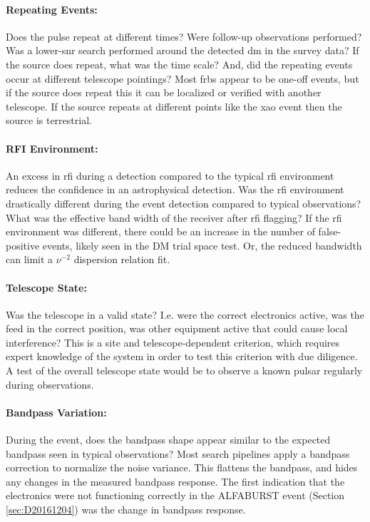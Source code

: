 \documentclass[a4paper,fleqn,usenatbib]{mnras}
\begin{document}
\paragraph{Repeating Events:}

Does the pulse repeat at different times? Were follow-up observations performed?
Was a lower-\gls{snr} search performed around the detected \gls{dm} in the
survey data? If the source does repeat, what was the time scale? And, did the
repeating events occur at different telescope pointings? Most \glspl{frb} appear
to be one-off events, but if the source does repeat this it can be localized or
verified with another telescope. If the source repeats at different points like
the \gls{xao} event then the source is terrestrial.

\paragraph{RFI Environment:}

An excess in \gls{rfi} during a detection compared to the typical \gls{rfi}
environment reduces the confidence in an astrophysical detection.  Was the
\gls{rfi} environment drastically different during the event detection compared
to typical observations? What was the effective band width of the receiver after
\gls{rfi} flagging? If the \gls{rfi} environment was different, there could be
an increase in the number of false-positive events, likely seen in the DM trial
space test. Or, the reduced bandwidth can limit a $\nu^{-2}$ dispersion relation
fit.

\paragraph{Telescope State:}

Was the telescope in a valid state? I.e. were the correct electronics active,
was the feed in the correct position, was other equipment active that could
cause local interference? This is a site and telescope-dependent criterion,
which requires expert knowledge of the system in order to test this criterion
with due diligence.  A test of the overall telescope state would be to observe a
known pulsar regularly during observations.

\paragraph{Bandpass Variation:}

During the event, does the bandpass shape appear similar to the expected
bandpass seen in typical observations? Most search pipelines apply a bandpass
correction to normalize the noise variance. This flattens the bandpass, and
hides any changes in the measured bandpass response. The first indication that
the electronics were not functioning correctly in the ALFABURST event (Section
\ref{sec:D20161204}) was the change in bandpass response.
\end{document}
